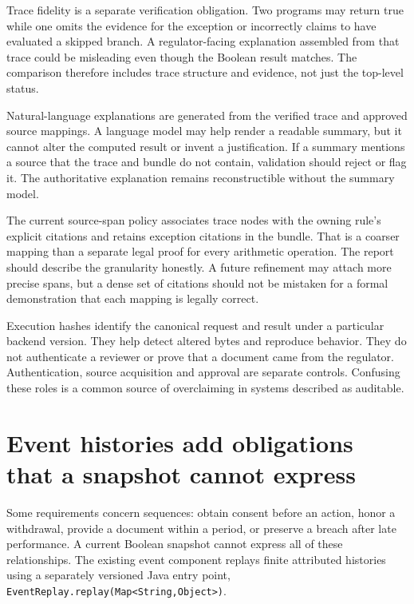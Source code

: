 Trace fidelity is a separate verification obligation. Two programs may return
true while one omits the evidence for the exception or incorrectly claims to have
evaluated a skipped branch. A regulator-facing explanation assembled from that
trace could be misleading even though the Boolean result matches. The comparison
therefore includes trace structure and evidence, not just the top-level status.


Natural-language explanations are generated from the verified trace and approved
source mappings. A language model may help render a readable summary, but it
cannot alter the computed result or invent a justification. If a summary mentions
a source that the trace and bundle do not contain, validation should reject or
flag it. The authoritative explanation remains reconstructible without the
summary model.

The current source-span policy associates trace nodes with the owning rule's
explicit citations and retains exception citations in the bundle. That is a
coarser mapping than a separate legal proof for every arithmetic operation. The
report should describe the granularity honestly. A future refinement may attach
more precise spans, but a dense set of citations should not be mistaken for a
formal demonstration that each mapping is legally correct.

Execution hashes identify the canonical request and result under a particular
backend version. They help detect altered bytes and reproduce behavior. They do
not authenticate a reviewer or prove that a document came from the regulator.
Authentication, source acquisition and approval are separate controls. Confusing
these roles is a common source of overclaiming in systems described as auditable.

\section{Event histories add obligations that a snapshot cannot express}
\label{merge:M07:11}


Some requirements concern sequences: obtain consent before an action, honor a
withdrawal, provide a document within a period, or preserve a breach after late
performance. A current Boolean snapshot cannot express all of these relationships.
The existing event component replays finite attributed histories using a separately
versioned Java entry point, \texttt{EventReplay.replay(Map<String,Object>)}.

